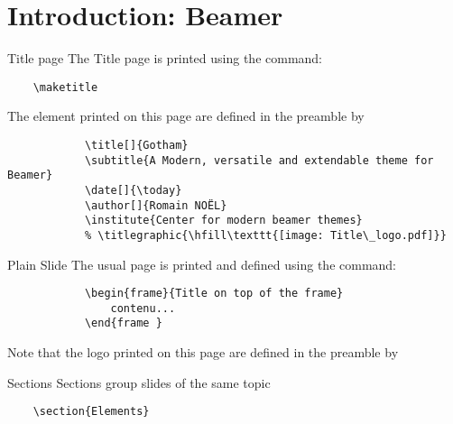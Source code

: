 \documentclass[aspectratio=169]{beamer}
\begin{document}
\section{Introduction: Beamer}

	\begin{frame}[fragile]{Title page}
		The Title page is printed using the command:			
		\begin{verbatim}    \maketitle\end{verbatim}
		
		The element printed on this page are defined in the preamble by
		\begin{verbatim}
			\title[]{Gotham}
			\subtitle{A Modern, versatile and extendable theme for Beamer}
			\date[]{\today}
			\author[]{Romain NOËL}
			\institute{Center for modern beamer themes}
			% \titlegraphic{\hfill\texttt{[image: Title\_logo.pdf]}}
		\end{verbatim}
	\end{frame}
	
	\begin{frame}[fragile]{Plain Slide}
		The usual page is printed and defined using the command:			
		\begin{verbatim}
			\begin{frame}{Title on top of the frame}
				contenu...
			\end{frame }
		\end{verbatim}
		
		Note that the logo printed on this page are defined in the preamble by
	\end{frame}

	\begin{frame}[fragile]{Sections}
		Sections group slides of the same topic
		
		\begin{verbatim}    \section{Elements}\end{verbatim}
	\end{frame}
\end{document}
